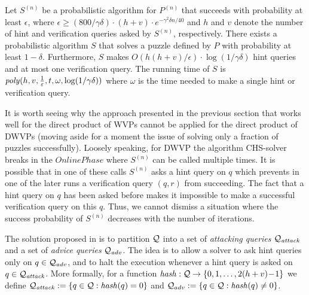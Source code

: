 \begin{theorem}
\label{lemma:dwvp}
Let $S^{(n)}$ be a probabilistic algorithm for $P^{(n)}$ that succeeds with
probability at least $\epsilon$, where $\epsilon \geq (800/\gamma\delta) \cdot (h+v) \cdot e^{-\gamma^2\delta n/40}$ and $h$ and $v$
denote the number of hint and verification queries asked by $S^{(n)}$, respectively.
There exists a probabilistic algorithm $S$ that solves a puzzle defined by $P$ with probability at least $1-\delta$.
Furthermore, $S$ makes $O(h(h+v)/\epsilon) \cdot \log(1/\gamma\delta)$ hint queries and at most one verification query.
The running time of $S$ is $\operatorname{\mathit{poly}}(h,v,\frac{1}{\varepsilon}, t, \omega, \log(1/\gamma\delta))$ where
$\omega$ is the time needed to make a single hint or verification query.
\end{theorem}

It is worth seeing why the approach presented in the previous section that works well for the direct product of WVPs
cannot be applied for the direct product of DWVPs (moving aside for a moment the issue of solving only a fraction of puzzles successfully).
Loosely speaking, for DWVP the algorithm CHS-solver breaks in the $\mathit{OnlinePhase}$ where $S^{(n)}$ can be called multiple times.
It is possible that in one of these calls $S^{(n)}$ asks a hint query on $q$
which prevents in one of the later runs a verification query $(q,r)$ from succeeding.
The fact that a hint query on $q$ has been asked before makes it impossible to make a successful verification query on this $q$.
Thus, we cannot dismiss a situation where the success probability of $S^{(n)}$ decreases with the number of iterations.

The solution proposed in \cite{dodis2009security} is to partition $\mathcal{Q}$ into a set of \textit{attacking queries} $\mathcal{Q}_{\mathit{attack}}$
and a set of \textit{advice queries} $\mathcal{Q}_{\mathit{adv}}$. The idea is to allow a solver to ask hint
queries only on $q \in \mathcal{Q}_{\mathit{adv}}$, and to halt the execution whenever a hint query is asked on $q \in \mathcal{Q}_{\mathit{attack}}$.
More formally, for a function $\operatorname{\mathit{hash}}:\mathcal{Q} \rightarrow \{0,1,\dotsc, 2(h+v)\!-\!1 \}$
we define $\mathcal{Q}_{\mathit{attack}} := \{q \in \mathcal{Q} : \operatorname{\mathit{hash}}(q) = 0 \}$ and $\mathcal{Q}_{adv} := \{q \in \mathcal{Q}: \operatorname{\mathit{hash}}(q) \neq 0\}$.

